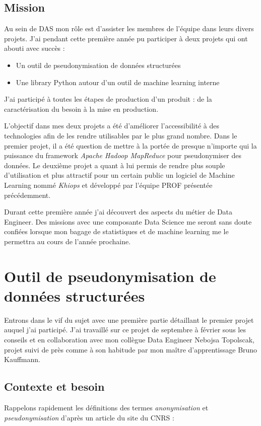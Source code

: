 \documentclass[12pt]{report}
\begin{document}
	\section*{Mission}
	Au sein de DAS mon rôle est d'assister les membres de l'équipe dans leurs divers projets. J'ai pendant cette première année pu participer à deux projets qui ont abouti avec succès :
	\begin{itemize}
		\item Un outil de pseudonymisation de données structurées
		\item Une library Python autour d'un outil de machine learning interne
	\end{itemize}
	J'ai participé à toutes les étapes de production d'un produit : de la caractérisation du besoin à la mise en production.
	
	L'objectif dans mes deux projets a été d'améliorer l'accessibilité à des technologies afin de les rendre utilisables par le plus grand nombre.
	Dans le premier projet, il a été question de mettre à la portée de presque n'importe qui la puissance du framework \textit{Apache Hadoop MapReduce} pour pseudonymiser des données. Le deuxième projet a quant à lui permis de rendre plus souple d'utilisation et plus attractif pour un certain public un logiciel de Machine Learning nommé \textit{Khiops} et développé par l'équipe PROF présentée précédemment.
	
	Durant cette première année j'ai découvert des aspects du métier de Data Engineer. Des missions avec une composante Data Science me seront sans doute confiées lorsque mon bagage de statistiques et de machine learning me le permettra au cours de l'année prochaine.
	
	
	\newpage
	\chapter{Outil de pseudonymisation de données structurées}
	Entrons dans le vif du sujet avec une première partie détaillant le premier projet auquel j'ai participé. J'ai travaillé sur ce projet de septembre à février sous les conseils et en collaboration avec mon collègue Data Engineer Nebojsa Topolscak, projet suivi de près comme à son habitude par mon maître d'apprentissage Bruno Kauffmann.
	\section{Contexte et besoin}
	Rappelons rapidement les définitions des termes \textit{anonymisation} et \textit{pseudonymisation} d'après un article du site du CNRS \cite{cnrs}:
	
\end{document}

